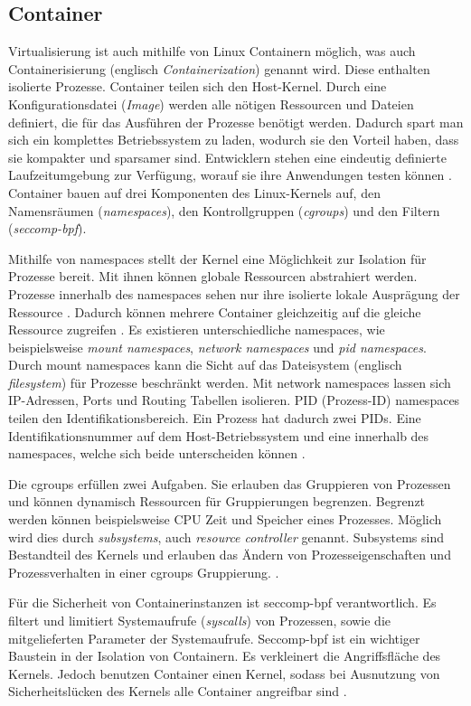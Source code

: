 \subsection{Container}
Virtualisierung ist auch mithilfe von Linux Containern möglich,
was auch Containerisierung (englisch \emph{Containerization})
genannt wird. Diese enthalten isolierte Prozesse.
Container teilen sich den Host-Kernel. Durch eine
Konfigurationsdatei (\emph{Image}) werden alle
nötigen Ressourcen und Dateien definiert, die für das Ausführen
der Prozesse benötigt werden. Dadurch spart man sich ein komplettes
Betriebssystem zu laden, wodurch sie den Vorteil haben,
dass sie kompakter und sparsamer sind. Entwicklern stehen eine eindeutig
definierte Laufzeitumgebung zur Verfügung, worauf sie ihre Anwendungen testen können
\cite{RedHatContainer}. Container bauen auf drei Komponenten
des Linux-Kernels auf, den Namensräumen
(\emph{namespaces}),
den Kontrollgruppen
(\emph{cgroups})
und den Filtern (\emph{seccomp-bpf}).

Mithilfe von namespaces stellt der Kernel eine Möglichkeit zur Isolation
für Prozesse bereit. Mit ihnen können globale Ressourcen abstrahiert werden.
Prozesse innerhalb des namespaces sehen nur ihre isolierte lokale
Ausprägung der Ressource \cite{UbuntuNamespaces}.
Dadurch können mehrere Container gleichzeitig auf die gleiche
Ressource zugreifen \cite{RedHatIntroToLinuxContainers}.
Es existieren unterschiedliche namespaces, wie beispielsweise
\emph{mount namespaces}, \emph{network namespaces}
und \emph{pid namespaces}.
Durch mount namespaces kann die Sicht auf das Dateisystem
(englisch \emph{filesystem}) für Prozesse beschränkt werden.
Mit network namespaces lassen sich IP-Adressen, Ports
und Routing Tabellen isolieren. PID (Prozess-ID) namespaces teilen
den Identifikationsbereich. Ein Prozess hat dadurch zwei
PIDs. Eine Identifikationsnummer auf dem Host-Betriebssystem und eine
innerhalb des namespaces, welche sich beide unterscheiden können
\cite{LwnDotNetNamespaces}.

Die cgroups erfüllen zwei Aufgaben. Sie erlauben das Gruppieren
von Prozessen und können dynamisch Ressourcen für Gruppierungen begrenzen.
Begrenzt werden können beispielsweise CPU Zeit und Speicher eines Prozesses.
Möglich wird dies durch \emph{subsystems},
auch \emph{resource controller} genannt. Subsystems sind Bestandteil
des Kernels und erlauben das Ändern von Prozesseigenschaften und
Prozessverhalten in einer cgroups Gruppierung. 
\cite{RedHatIntroToLinuxContainers}.

Für die Sicherheit von Containerinstanzen ist seccomp-bpf 
verantwortlich. Es filtert und limitiert
Systemaufrufe (\emph{syscalls}) von Prozessen,
sowie die mitgelieferten Parameter der Systemaufrufe.
Seccomp-bpf ist ein wichtiger Baustein in der Isolation von
Containern. Es verkleinert die Angriffsfläche 
des Kernels. Jedoch benutzen Container einen
Kernel, sodass bei Ausnutzung von Sicherheitslücken
des Kernels alle Container angreifbar sind \cite{Firecracker}.

